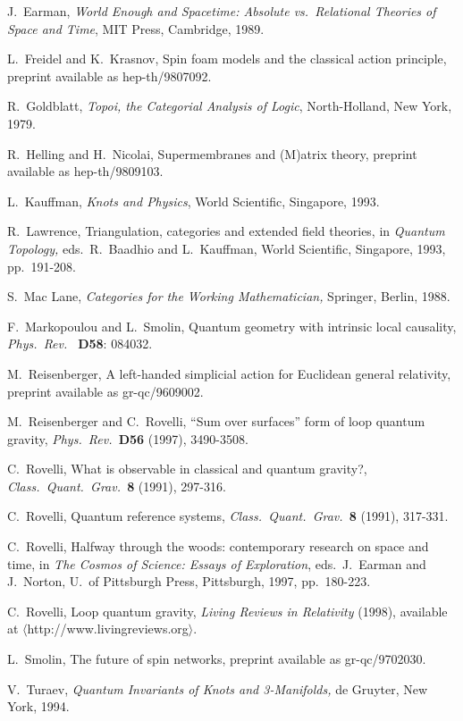 \begin{thebibliography}{99}
 J.\ Earman, {\sl World Enough and Spacetime: Absolute
vs.\ Relational Theories of Space and Time}, MIT Press, Cambridge, 1989.

 L.\ Freidel and K.\ Krasnov, Spin foam models and the
classical action principle, preprint available as hep-th/9807092. 

 R.\ Goldblatt, {\sl Topoi, the Categorial Analysis 
of Logic}, North-Holland, New York, 1979.

 R.\ Helling and H.\ Nicolai, Supermembranes and (M)atrix
theory, preprint available as hep-th/9809103.

 L.\ Kauffman, {\sl Knots and Physics}, World
Scientific, Singapore, 1993.

 R.\ Lawrence,  Triangulation, categories and extended field
theories, in {\sl Quantum Topology,} eds.\ R.\ Baadhio and L.\ Kauffman,
World Scientific, Singapore, 1993, pp.\ 191-208.

 S.\ Mac Lane, {\sl Categories for the Working
Mathematician,} Springer, Berlin, 1988.

 F.\ Markopoulou and L.\ Smolin, 
Quantum geometry with intrinsic local causality, {\sl Phys.\ Rev.\ } 
{\bf D58}: 084032.

 M.\ Reisenberger, A left-handed simplicial action for
Euclidean general relativity, preprint available as gr-qc/9609002.  

 M.\ Reisenberger and C.\ Rovelli, ``Sum over surfaces''
form of loop quantum gravity, {\sl Phys.\ Rev.\ }{\bf D56} (1997), 
3490-3508. 

 C.\ Rovelli, What is observable in classical and
quantum gravity?, {\sl Class.\ Quant.\ Grav.\ }{\bf 8} (1991), 297-316. 

 C.\ Rovelli, Quantum reference systems, 
{\sl Class.\ Quant.\ Grav.\ }{\bf 8} (1991), 317-331.

 C.\ Rovelli, Halfway through the woods: contemporary
research on space and time, in {\sl The Cosmos of Science: Essays of
Exploration}, eds.\ J.\ Earman and J.\ Norton, U.\ of Pittsburgh Press,
Pittsburgh, 1997, pp.\ 180-223.

 C.\ Rovelli, Loop quantum gravity, {\sl Living
Reviews in Relativity} (1998), available at
$\langle$http://www.livingreviews.org$\rangle$. 

 L.\ Smolin, The future of spin networks, preprint
available as gr-qc/9702030.

 V.\ Turaev, {\sl Quantum Invariants of Knots and
3-Manifolds,} de Gruyter, New York, 1994.

\end{thebibliography}


